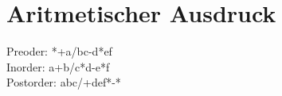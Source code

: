 \section{Aritmetischer Ausdruck}

Preoder:
	*+a/bc-d*ef\\
Inorder:
	a+b/c*d-e*f\\
Postorder:
	abc/+def*-*